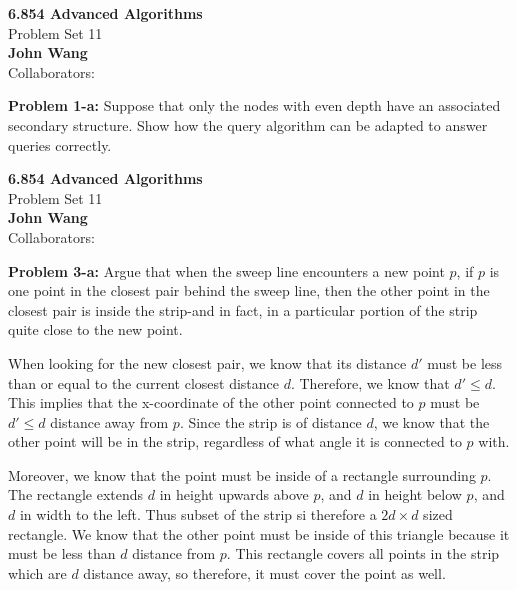 \documentclass[psamsfonts]{amsart}
\newenvironment{sol}{\vspace{0.25cm}{\large \bfseries Solution:}}{\qedsymbol}
\newenvironment{prob}[1]{\begin{framed}{\large \bfseries Problem #1:}}{\end{framed}}
\newcommand{\makenewtitle}{
    \begin{center}
    {\huge \bfseries 6.854 Advanced Algorithms} \\
    Problem Set 11\\
    \vspace{0.25cm}
    {\bfseries John Wang} \\
    Collaborators:  
    \end{center}
    \vspace{0.5cm}
}
\begin{document}
\makenewtitle

\begin{prob}{1-a}
Suppose that only the nodes with even depth have an associated secondary structure. Show how the query algorithm can be adapted to answer queries correctly.
\end{prob}
\begin{sol}

\end{sol}

\newpage
\makenewtitle
\begin{prob}{3-a}
Argue that when the sweep line encounters a new point $p$, if $p$ is one point in the closest pair behind the sweep line, then the other point in the closest pair is inside the strip-and in fact, in a particular portion of the strip quite close to the new point.
\end{prob}
\begin{sol}
When looking for the new closest pair, we know that its distance $d'$ must be less than or equal to the current closest distance $d$. Therefore, we know that $d' \leq d$. This implies that the x-coordinate of the other point connected to $p$ must be $d' \leq d$ distance away from $p$. Since the strip is of distance $d$, we know that the other point will be in the strip, regardless of what angle it is connected to $p$ with. 

Moreover, we know that the point must be inside of a rectangle surrounding $p$. The rectangle extends $d$ in height upwards above $p$, and $d$ in height below $p$, and $d$ in width to the left. Thus subset of the strip si therefore a $2d \times d$ sized rectangle. We know that the other point must be inside of this triangle because it must be less than $d$ distance from $p$. This rectangle covers all points in the strip which are $d$ distance away, so therefore, it must cover the point as well.
\end{sol}
\end{document}
